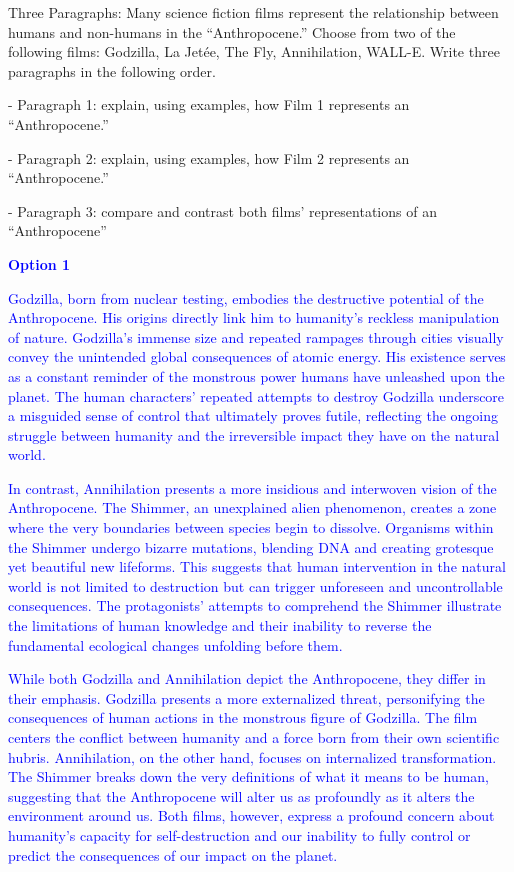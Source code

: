 \documentclass[11pt,fleqn]{book}
\begin{document}
\begin{exercise}
    Three Paragraphs: Many science fiction films represent the relationship between humans and non-humans in the “Anthropocene.” Choose from two of the following films: Godzilla, La Jetée, The Fly, Annihilation, WALL-E. Write three paragraphs in the following order.

- Paragraph 1: explain, using examples, how Film 1 represents an “Anthropocene.”

- Paragraph 2: explain, using examples, how Film 2 represents an “Anthropocene.”

- Paragraph 3: compare and contrast both films’ representations of an “Anthropocene”

\textcolor{blue}{
\textbf{Option 1}
}

\textcolor{blue}{
Godzilla, born from nuclear testing, embodies the destructive potential of the Anthropocene. His origins directly link  him to humanity's reckless manipulation of nature. Godzilla's immense size and repeated rampages through cities visually convey the unintended global consequences of atomic energy. His existence serves as a constant reminder of the monstrous power humans have unleashed upon the planet. The human characters' repeated attempts to destroy Godzilla underscore a misguided sense of control that ultimately proves futile, reflecting the ongoing struggle between humanity and the irreversible impact they have on the natural world.
}

\textcolor{blue}{
In contrast, Annihilation presents a more insidious and interwoven vision of the Anthropocene.  The Shimmer, an unexplained alien phenomenon, creates a zone where the very boundaries between species begin to dissolve. Organisms within the Shimmer undergo bizarre mutations, blending DNA and creating grotesque yet beautiful new lifeforms. This suggests that  human intervention in the natural world is not limited to destruction but can trigger unforeseen and uncontrollable consequences. The protagonists' attempts to comprehend the Shimmer illustrate the limitations of human knowledge and their inability to reverse the fundamental ecological changes unfolding before them.
}

\textcolor{blue}{
While both Godzilla and Annihilation depict the Anthropocene, they differ in their emphasis.  Godzilla presents a more externalized threat, personifying the consequences of human actions in the monstrous figure of Godzilla. The film centers the conflict between humanity and  a force born from their own scientific hubris. Annihilation, on the other hand,  focuses on internalized transformation. The Shimmer breaks down the very definitions of what it means to be human, suggesting that the Anthropocene will alter us as profoundly as it alters the environment around us.  Both films, however, express a profound concern about humanity's capacity for self-destruction and our inability to fully control or predict the consequences of our impact on the planet.
}


\end{exercise}
\end{document}
